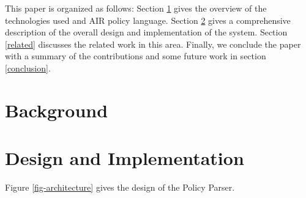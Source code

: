 \documentclass{llncs}
\begin{document}


This paper is organized as follows:
Section \ref{background} gives the overview of the technologies used and AIR policy language.  
Section \ref{design} gives a comprehensive description of the overall design and implementation of the system.
Section \ref{related} discusses the related work in this area.
Finally, we conclude the paper with a summary of the contributions and some future work in section \ref{conclusion}.



\section{Background} \label{background}


\section{Design and Implementation} \label{design}

Figure \ref{fig-architecture} gives the design of the Policy Parser.
\end{document}
